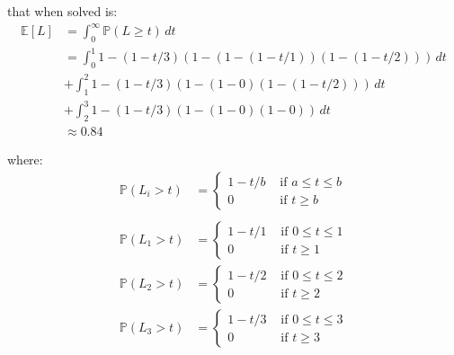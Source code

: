 \documentclass{article}
\begin{document}
\begin{enumerate}
\begin{enumerate}
        that when solved is:
        \begin{equation}
            \begin{split}
                \mathbb{E}{[L]} &= \int_{0}^{\infty}\mathbb{P}{(L \geq t)}\, dt\\
                &= \int_{0}^{1} 1-(1-t/3)(1-(1-(1-t/1))(1-(1-t/2))) \, dt \\
                &+ \int_{1}^{2} 1-(1-t/3)(1-(1-0)(1-(1-t/2))) \, dt \\
                &+ \int_{2}^{3} 1-(1-t/3)(1-(1-0)(1-0)) \, dt \\
                &\approx{0.84}
            \end{split}
        \end{equation}

        where:
        \begin{equation}
            \begin{split}
                \mathbb{P}{(L_i > t)} &= \begin{cases}
                    1-t/b & \text{ if } a \leq t \leq b\\
                    0 & \text{ if } t \geq b
                \end{cases}\\~\\
                \mathbb{P}{(L_1 > t)} &= \begin{cases}
                    1-t/1 & \text{ if } 0 \leq t \leq 1\\
                    0 & \text{ if } t \geq 1
                \end{cases}\\
                \mathbb{P}{(L_2 > t)} &= \begin{cases}
                    1-t/2 & \text{ if } 0 \leq t \leq 2\\
                    0 & \text{ if } t \geq 2
                \end{cases}\\
                \mathbb{P}{(L_3 > t)} &= \begin{cases}
                    1-t/3 & \text{ if } 0 \leq t \leq 3\\
                    0 & \text{ if } t \geq 3
                \end{cases}\\
            \end{split}
        \end{equation}
    \end{enumerate}


\end{enumerate}
\end{document}
